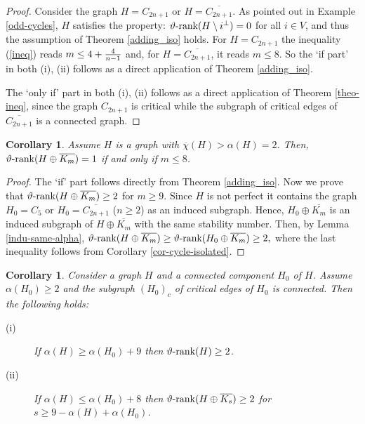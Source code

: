 \documentclass[11pt]{article}
\newtheorem{coro}[theorem]{Corollary}
\numberwithin{equation}{section}
\newcommand{\rrank}{\vartheta\text{\rm -rank}}
\newcommand{\MoL}{\textcolor{red}}
\begin{document}
\begin{proof}
Consider the graph $H=C_{2n+1}$ or $H=\overline{C_{2n+1}}$.
As pointed out in Example \ref{odd-cycles}, %
 $H$ satisfies  the property: $\rrank (H\setminus i^{\perp})=0$ for all $i\in V$, and thus   the assumption  of Theorem \ref{adding_iso} holds. For $H=C_{2n+1}$ the inequality (\ref{ineq}) reads $m\le 4 + {4\over n-1}$ and, for $H=\overline {C_{2n+1}}$, it reads $m\le 8$. So the `if part' in both (i), (ii) follows as a direct application of 
Theorem \ref{adding_iso}.

The `only if' part in both (i), (ii) follows as a direct application of  Theorem \ref{theo-ineq},  since the graph $C_{2n+1}$ is critical while the subgraph of critical edges of  $\overline{C_{2n+1}}$ is a connected graph.%
\end{proof}


\begin{coro}\label{corH2}
Assume  $H$ is a graph with $\overline{\chi}(H)>\alpha(H)=2$.
 Then,  $\rrank(H\oplus \overline{K_m})=1$ if and only if $m\leq 8$.
\end{coro}

\begin{proof}
The `if' part follows directly from Theorem \ref{adding_iso}. Now we prove that $\rrank(H\oplus \overline{K_m})\geq 2$ for $m\geq 9$. Since $H$ is not perfect it contains the graph $H_0=C_5$ or $H_0=\overline{C_{2n+1}}$ ($n\ge 2$) as an induced subgraph. Hence, $H_0\oplus \overline{K_m}$ is an induced subgraph of $H\oplus \overline{K_m}$ with the same stability number. Then, by Lemma \ref{indu-same-alpha}, $\rrank(H\oplus \overline{K_m})\geq \rrank(H_0\oplus \overline{K_m})\geq 2,$ where the last inequality follows from Corollary \ref{cor-cycle-isolated}.
\end{proof}

\begin{coro}
Consider a graph $H$ and a connected component $H_0$ of $H$. Assume $\alpha(H_0) \geq 2$ and the subgraph $(H_0)_c$ of critical edges of $H_0$ is connected. 
Then the following holds:
\begin{description}
\item[(i)]  If $\alpha(H)\geq \alpha(H_0)+9$ then $\rrank(H)\geq 2$.
\item[(ii)]  If $\alpha(H)\leq \alpha(H_0)+8$ then $\rrank(H\oplus \overline{K_s})\geq 2$ for $s\geq 9-\alpha(H)+\alpha(H_0)$.
\end{description}
\end{coro}
\end{document}
